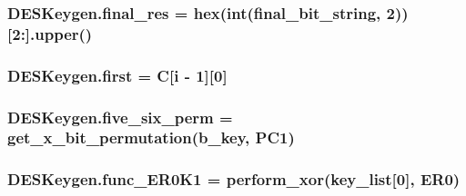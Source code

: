 \subsubsection[{\texorpdfstring{final\+\_\+res}{final_res}}]{\setlength{\rightskip}{0pt plus 5cm}D\+E\+S\+Keygen.\+final\+\_\+res = hex(int({\bf final\+\_\+bit\+\_\+string}, 2))\mbox{[}2\+:\mbox{]}.upper()}\hypertarget{namespaceDESKeygen_a0b62d751252e5fe18e6f9b68ace70a5f}{}\label{namespaceDESKeygen_a0b62d751252e5fe18e6f9b68ace70a5f}
\subsubsection[{\texorpdfstring{first}{first}}]{\setlength{\rightskip}{0pt plus 5cm}D\+E\+S\+Keygen.\+first = {\bf C}\mbox{[}i -\/ 1\mbox{]}\mbox{[}0\mbox{]}}\hypertarget{namespaceDESKeygen_a275c92bf74886b149e31075ed4f24871}{}\label{namespaceDESKeygen_a275c92bf74886b149e31075ed4f24871}
\subsubsection[{\texorpdfstring{five\+\_\+six\+\_\+perm}{five_six_perm}}]{\setlength{\rightskip}{0pt plus 5cm}D\+E\+S\+Keygen.\+five\+\_\+six\+\_\+perm = {\bf get\+\_\+x\+\_\+bit\+\_\+permutation}({\bf b\+\_\+key}, {\bf P\+C1})}\hypertarget{namespaceDESKeygen_aac37a8b4dd18161457399781c486f483}{}\label{namespaceDESKeygen_aac37a8b4dd18161457399781c486f483}
\subsubsection[{\texorpdfstring{func\+\_\+\+E\+R0\+K1}{func_ER0K1}}]{\setlength{\rightskip}{0pt plus 5cm}D\+E\+S\+Keygen.\+func\+\_\+\+E\+R0\+K1 = {\bf perform\+\_\+xor}({\bf key\+\_\+list}\mbox{[}0\mbox{]}, {\bf E\+R0})}\hypertarget{namespaceDESKeygen_a4d187125752e3fdcb87d8aa96ba0de87}{}\label{namespaceDESKeygen_a4d187125752e3fdcb87d8aa96ba0de87}

